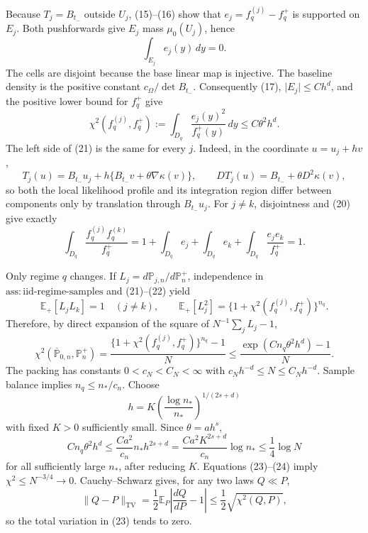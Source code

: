 Because \(T_j=B_{t_-}\) outside \(U_j\), (15)--(16) show that \(e_j=f_q^{(j)}-f_q^+\) is supported on \(E_j\).  Both pushforwards give \(E_j\) mass \(\mu_0(U_j)\), hence
\[
 \int_{E_j}e_j(y)\,dy=0.
 \tag{20}
\]
The cells are disjoint because the base linear map is injective.  The baseline density is the positive constant \(c_\Omega/\det B_{t_-}\).  Consequently (17), \(\lvert E_j\rvert\le Ch^d\), and the positive lower bound for \(f_q^+\) give
\[
 \chi^2(f_q^{(j)},f_q^+)
 :=\int_{D_q}\frac{e_j(y)^2}{f_q^+(y)}\,dy
 \le C\theta^2h^d.
 \tag{21}
\]
The left side of (21) is the same for every \(j\).  Indeed, in the coordinate \(u=u_j+hv\),
\[
 T_j(u)=B_{t_-}u_j+h\{B_{t_-}v+\theta\nabla\kappa(v)\},
 \qquad
 DT_j(u)=B_{t_-}+\theta D^2\kappa(v),
\]
so both the local likelihood profile and its integration region differ between components only by translation through \(B_{t_-}u_j\).  For \(j\ne k\), disjointness and (20) give exactly
\[
 \int_{D_q}\frac{f_q^{(j)}f_q^{(k)}}{f_q^+}
 =1+\int_{D_q}e_j+\int_{D_q}e_k+\int_{D_q}\frac{e_je_k}{f_q^+}=1.
 \tag{22}
\]

Only regime \(q\) changes.  If \(L_j=d\mathbb P_{j,n}/d\mathbb P_n^+\), independence in \(\mathrm{ass:iid\text{-}regime\text{-}samples}\) and (21)--(22) yield
\[
 \mathbb E_+[L_jL_k]=1\quad(j\ne k),
 \qquad
 \mathbb E_+[L_j^2]=\{1+\chi^2(f_q^{(j)},f_q^+)\}^{n_q}.
\]
Therefore, by direct expansion of the square of \(N^{-1}\sum_jL_j-1\),
\[
 \chi^2(\overline{\mathbb P}_{0,n},\mathbb P_n^+)
 =\frac{\{1+\chi^2(f_q^{(j)},f_q^+)\}^{n_q}-1}{N}
 \le\frac{\exp(Cn_q\theta^2h^d)-1}{N}.
 \tag{23}
\]
The packing has constants \(0<c_N<C_N<\infty\) with \(c_Nh^{-d}\le N\le C_Nh^{-d}\).  Sample balance implies \(n_q\le n_\ast/c_n\).  Choose
\[
 h=K\left(\frac{\log n_\ast}{n_\ast}\right)^{1/(2s+d)}
\]
with fixed \(K>0\) sufficiently small.  Since \(\theta=ah^s\),
\[
 Cn_q\theta^2h^d
 \le \frac{Ca^2}{c_n}n_\ast h^{2s+d}
 =\frac{Ca^2K^{2s+d}}{c_n}\log n_\ast
 \le\frac14\log N
 \tag{24}
\]
for all sufficiently large \(n_\ast\), after reducing \(K\).  Equations (23)--(24) imply \(\chi^2\le N^{-3/4}\to0\).  Cauchy--Schwarz gives, for any two laws \(Q\ll P\),
\[
 \lVert Q-P\rVert_{\mathrm{TV}}
 =\frac12\mathbb E_P\left\lvert\frac{dQ}{dP}-1\right\rvert
 \le\frac12\sqrt{\chi^2(Q,P)},
 \tag{25}
\]
so the total variation in (23) tends to zero.


